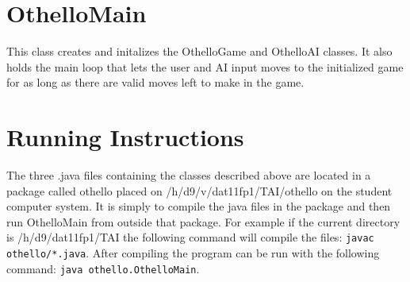 \documentclass[a4paper]{article}
\begin{document}
\section{OthelloMain}
This class creates and initalizes the OthelloGame and OthelloAI classes. It also holds the main loop that lets the user and AI input moves to the initialized game for as long as there are valid moves left to make in the game.

\section{Running Instructions}
The three .java files containing the classes described above are located in a package called othello placed on /h/d9/v/dat11fp1/TAI/othello on the student computer system. It is simply to compile the java files in the package and then run OthelloMain from outside that package. For example if the current directory is /h/d9/dat11fp1/TAI the following command will compile the files: \texttt{javac othello/*.java}. After compiling the program can be run with the following command: \texttt{java othello.OthelloMain}.

\end{document}
